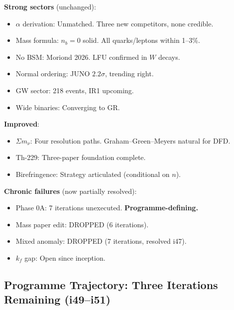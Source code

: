 \documentclass[11pt,a4paper]{article}
\begin{document}
\begin{tcolorbox}[colback=green!5!white, colframe=green!60!black,
  title={Theory Health: Stable-to-Improving, Phase 0A Defines Programme Success}]

\textbf{Strong sectors} (unchanged):
\begin{itemize}
\item $\alpha$ derivation: Unmatched. Three new competitors, none credible.
\item Mass formula: $n_b = 0$ solid. All quarks/leptons within 1--3\%.
\item No BSM: Moriond 2026. LFU confirmed in $W$ decays.
\item Normal ordering: JUNO $2.2\sigma$, trending right.
\item GW sector: 218 events, IR1 upcoming.
\item Wide binaries: Converging to GR.
\end{itemize}

\textbf{Improved}:
\begin{itemize}
\item $\Sigma m_\nu$: Four resolution paths. Graham--Green--Meyers natural for DFD.
\item Th-229: Three-paper foundation complete.
\item Birefringence: Strategy articulated (conditional on $n$).
\end{itemize}

\textbf{Chronic failures} (now partially resolved):
\begin{itemize}
\item Phase 0A: 7 iterations unexecuted. \textbf{Programme-defining.}
\item Mass paper edit: DROPPED (6 iterations).
\item Mixed anomaly: DROPPED (7 iterations, resolved i47).
\item $k_f$ gap: Open since inception.
\end{itemize}
\end{tcolorbox}

\subsection{Programme Trajectory: Three Iterations Remaining (i49--i51)}
\end{document}
